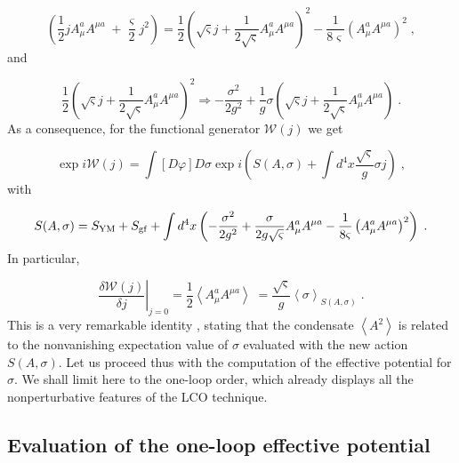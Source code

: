 \documentclass[a4paper,12pt]{article}
\begin{document}
\begin{equation}
\left( \frac{1}{2}jA_{\mu }^{a}A^{\mu a}\;+\frac{\varsigma }{2}j^{2}\right) =%
\frac{1}{2}\left( \sqrt{\varsigma }j+\frac{1}{2\sqrt{\varsigma }}A_{\mu
}^{a}A^{\mu a}\right) ^{2}-\frac{1}{8\varsigma }\left( A_{\mu }^{a}A^{\mu
a}\right) ^{2}\;,  \label{f1}
\end{equation}
and

\begin{equation}
\frac{1}{2}\left( \sqrt{\varsigma }j+\frac{1}{2\sqrt{\varsigma }}A_{\mu
}^{a}A^{\mu a}\right) ^{2}\Rightarrow -\frac{\sigma ^{2}}{2g^{2}}+\frac{1}{g}%
\sigma \left( \sqrt{\varsigma }j+\frac{1}{2\sqrt{\varsigma }}A_{\mu
}^{a}A^{\mu a}\right) \;.  \label{f2}
\end{equation}
As a consequence, for the functional generator $\mathcal{W}(j)$ we get

\begin{equation}
\exp i\mathcal{W}(j)=\int \left[ D\varphi \right] D\sigma \exp i\left(
S(A,\sigma )+\int d^{4}x\frac{\sqrt{\varsigma }}{g}\sigma j\right) \;,
\label{wjsa}
\end{equation}
with

\begin{equation}
S(A,\sigma )=S_{\mathrm{YM}}+S_{\mathrm{gf}}+\int d^{4}x\left( -\frac{\sigma
^{2}}{2g^{2}}+\frac{\sigma }{2g\sqrt{\varsigma }}A_{\mu }^{a}A^{\mu a}-\frac{%
1}{8\varsigma }\left( A_{\mu }^{a}A^{\mu a}\right) ^{2}\right) \;.
\label{sas}
\end{equation}
In particular,

\begin{equation}
\left. \frac{\delta \mathcal{W}(j)}{\delta j}\right| _{j=0}=\frac{1}{2}%
\left\langle A_{\mu }^{a}A^{\mu a}\right\rangle \;=\frac{\sqrt{\varsigma }}{g%
}\left\langle \sigma \right\rangle _{S(A,\sigma )}\;.  \label{ff}
\end{equation}
This is a very remarkable identity \cite{v1}, stating that the condensate $%
\left\langle A^{2}\right\rangle \;$is related to the nonvanishing
expectation value of $\sigma $ evaluated with the new action $S(A,\sigma )$.
Let us proceed thus with the computation of the effective potential for $%
\sigma $. We shall limit here to the one-loop order, which already displays
all the nonperturbative features of the LCO technique.

\subsection{Evaluation of the one-loop effective potential}
\end{document}

